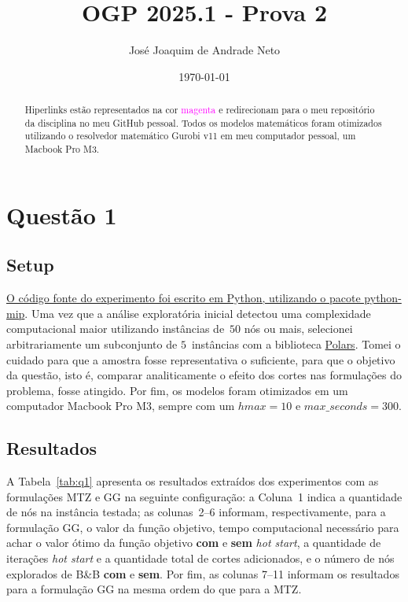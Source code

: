 \documentclass{article}
\title{OGP 2025.1 - Prova 2}
\author{José Joaquim de Andrade Neto}
\date{\today}
\begin{document}
\maketitle

\begin{abstract}
	Hiperlinks estão representados na cor \textcolor{magenta}{magenta} e redirecionam para o meu repositório da disciplina no meu GitHub pessoal.
	Todos os modelos matemáticos foram otimizados utilizando o resolvedor matemático Gurobi v11 em meu computador pessoal, um Macbook Pro M3.
\end{abstract}

\section{Questão 1}

\subsection{Setup}

\href{https://github.com/jose-joaquim/ogp-ufmg20251/blob/main/2nd-exam/question1.py}{O código fonte do experimento foi escrito em Python, utilizando o pacote python-mip}.
Uma vez que a análise exploratória inicial detectou uma complexidade computacional maior utilizando instâncias de~$50$ nós ou mais, selecionei arbitrariamente um subconjunto de $5$~instâncias com a biblioteca \href{https://pola.rs/}{Polars}.
Tomei o cuidado para que a amostra fosse representativa o suficiente, para que o objetivo da questão, isto é, comparar analiticamente o efeito dos cortes nas formulações do problema, fosse atingido.
Por fim, os modelos foram otimizados em um computador Macbook Pro M3, sempre com um $hmax = 10$ e $max\_seconds = 300$.

\subsection{Resultados}

A Tabela~\ref{tab:q1} apresenta os resultados extraídos dos experimentos com as formulações MTZ e GG na seguinte configuração: a Coluna~1 indica a quantidade de nós na instância testada; as colunas~2--6 informam, respectivamente, para a formulação GG, o valor da função objetivo, tempo computacional necessário para achar o valor ótimo da função objetivo \textbf{com} e \textbf{sem} \textsl{hot start}, a quantidade de iterações \textsl{hot start} e a quantidade total de cortes adicionados, e o número de nós explorados de B\&B \textbf{com} e \textbf{sem}.
Por fim, as colunas 7--11 informam os resultados para a formulação GG na mesma ordem do que para a MTZ.
\end{document}
